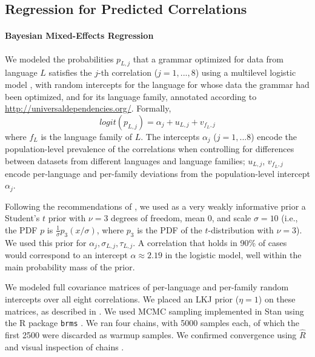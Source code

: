 \documentclass[10pt,twoside,lineno]{article}
\begin{document}
\subsection{Regression for Predicted Correlations}



\paragraph{Bayesian Mixed-Effects Regression}
We modeled the probabilities $p_{L,j}$ that a grammar optimized for data from language $L$ satisfies the $j$-th correlation ($j=1,...,8$) using a multilevel logistic model \cite{gelman2013bayesian}, with random intercepts for the language for whose data the grammar had been optimized, and for its language family, annotated according to \url{http://universaldependencies.org/}.
Formally,
\begin{equation}\label{eq:mixed-effects}
logit(p_{L,j}) = \alpha_j + u_{L,j} + v_{f_L,j}
\end{equation}
where $f_L$ is the language family of $L$.
The intercepts $\alpha_j$ ($j=1,...8$) encode the population-level prevalence of the correlations when controlling for differences between datasets from different languages and language families; $u_{L,j}$, $v_{f_L,j}$ encode per-language and per-family deviations from the population-level intercept $\alpha_j$.



Following the recommendations of \cite{ghosh2018use, burkner2018advanced}, we used as a very weakly informative prior a Student's $t$ prior with $\nu=3$ degrees of freedom, mean 0, and scale $\sigma=10$ (i.e., the PDF $p$ is $\frac{1}{\sigma} p_3(x/\sigma)$, where $p_3$ is the PDF of the $t$-distribution with $\nu=3$).
We used this prior for $\alpha_j, \sigma_{L,j}, \tau_{L,j}$.
A correlation that holds in 90\% of cases would correspond to an intercept $\alpha \approx 2.19$ in the logistic model, well within the main probability mass of the prior.

We modeled full covariance matrices of per-language and per-family random intercepts over all eight correlations. We placed an LKJ prior ($\eta=1$) on these matrices, as described in \cite{burkner2018advanced}.
We used MCMC sampling implemented in Stan \cite{carpenter2017stan, hoffman2014no} using the R package \texttt{brms} \cite{buerkner2017brms}.
We ran four chains, with 5000 samples each, of which the first 2500 were discarded as warmup samples.
We confirmed convergence using $\hat{R}$ and visual inspection of chains \cite{gelman2013bayesian}.
\end{document}
